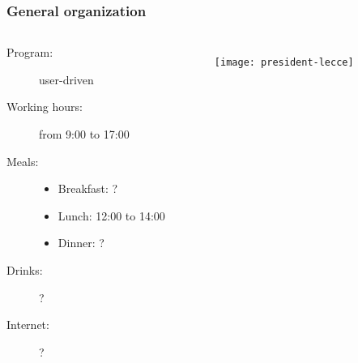 \begin{frame}[t]
\frametitle{General organization}
\footnotesize

\begin{columns}[totalwidth=\textwidth,c]


\begin{description}

\item[Program:] user-driven 
\item[Working hours:] from 9:00 to 17:00
\item[]
\item[Meals:]\begin{itemize}
\item Breakfast: ?
\item Lunch: 12:00 to 14:00
\item Dinner: ?
\end{itemize}
\item[Drinks:] ? %
\item[]
\item[Internet:] ? %
\end{description}

{
\begin{figure}
\centering
\texttt{[image: president-lecce]}
\end{figure}
}
\end{columns}
\end{frame}


